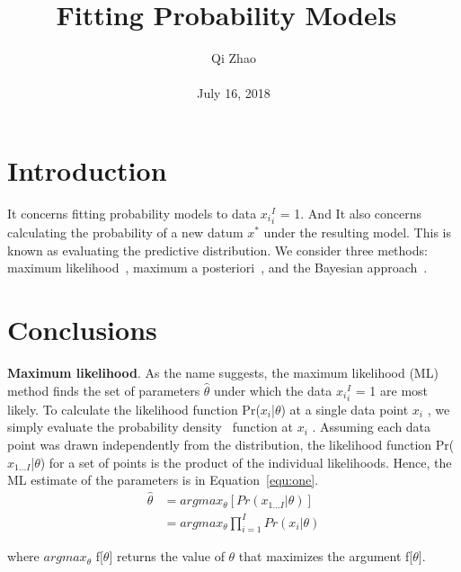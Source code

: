 \documentclass[10pt,twocolumn,letterpaper]{article}
\begin{document}
\title{Fitting Probability Models~\cite{deni2009fitting}}
\author{Qi Zhao\\\\July 16, 2018}

\maketitle
\section{Introduction}
It concerns fitting probability models to data ${x_i}_i^I$ = 1. And It also concerns calculating the probability of a new datum $x^*$ under the resulting model. This is known as evaluating the predictive distribution. We consider three methods: maximum likelihood~\cite{felsenstein1981evolutionary}, maximum a posteriori~\cite{gauvain1994maximum}, and the Bayesian approach~\cite{fei2007learning}.


\section{Conclusions}
\textbf{ Maximum likelihood}. As the name suggests, the maximum likelihood (ML) method finds the set of parameters $\hat{\theta}$ under which the data ${x_i}_i^I$ = 1 are most likely. To calculate the likelihood function Pr($x_i$|$\theta$) at a single data point $x_i$ , we simply evaluate the probability density~\cite{parzen1962estimation} function at $x_i$ . Assuming each data point was drawn independently from the distribution, the likelihood function Pr($x_{1...I}$|$\theta$) for a set of points is the product of the individual likelihoods. Hence, the ML estimate of the parameters is in Equation~\ref{equ:one}.
\begin{equation}
\begin{split}
\hat{\theta}& = argmax _{\theta}[Pr(x_{1...I}|\theta)]\\
  & = argmax _{\theta}\prod_{i = 1}^{I} Pr(x_i|\theta)
   \label{equ:one}
\end{split}
\end{equation}

\par where $argmax _{\theta}$ f[$\theta$] returns the value of $\theta$ that maximizes the argument f[$\theta$].
\end{document}
